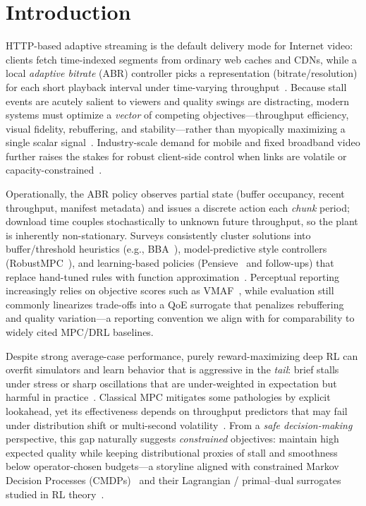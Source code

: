 \documentclass[preprint,12pt]{elsarticle}
\begin{document}
\section{Introduction}
\label{sec:intro}

HTTP-based adaptive streaming is the default delivery mode for Internet video: clients fetch time-indexed segments from ordinary web caches and CDNs, while a local \emph{adaptive bitrate} (ABR) controller picks a representation (bitrate/resolution) for each short playback interval under time-varying throughput~\cite{sodagar2011mpeg,bentaleb2018survey}.
Because stall events are acutely salient to viewers and quality swings are distracting, modern systems must optimize a \emph{vector} of competing objectives---throughput efficiency, visual fidelity, rebuffering, and stability---rather than myopically maximizing a single scalar signal~\cite{wu2024qoe}.
Industry-scale demand for mobile and fixed broadband video further raises the stakes for robust client-side control when links are volatile or capacity-constrained~\cite{cisco2023}.

Operationally, the ABR policy observes partial state (buffer occupancy, recent throughput, manifest metadata) and issues a discrete action each \emph{chunk} period; download time couples stochastically to unknown future throughput, so the plant is inherently non-stationary.
Surveys consistently cluster solutions into buffer/threshold heuristics (e.g., BBA~\cite{huang2014buffer}), model-predictive style controllers (RobustMPC~\cite{yin2015control}), and learning-based policies (Pensieve~\cite{mao2017neural} and follow-ups) that replace hand-tuned rules with function approximation~\cite{bentaleb2018survey,wu2024qoe}.
Perceptual reporting increasingly relies on objective scores such as VMAF~\cite{li2016vmaf}, while evaluation still commonly linearizes trade-offs into a QoE surrogate that penalizes rebuffering and quality variation---a reporting convention we align with for comparability to widely cited MPC/DRL baselines.

Despite strong average-case performance, purely reward-maximizing deep RL can overfit simulators and learn behavior that is aggressive in the \emph{tail}: brief stalls under stress or sharp oscillations that are under-weighted in expectation but harmful in practice~\cite{sutton2018reinforcement,mao2017neural}.
Classical MPC mitigates some pathologies by explicit lookahead, yet its effectiveness depends on throughput predictors that may fail under distribution shift or multi-second volatility~\cite{yin2015control,sun2016cs2p}.
From a \emph{safe decision-making} perspective, this gap naturally suggests \emph{constrained} objectives: maintain high expected quality while keeping distributional proxies of stall and smoothness below operator-chosen budgets---a storyline aligned with constrained Markov Decision Processes (CMDPs)~\cite{altman1999constrained} and their Lagrangian / primal--dual surrogates studied in RL theory~\cite{paternain2019dual}.
\end{document}
